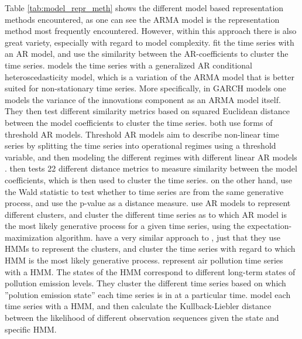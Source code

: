 Table \ref{tab:model_repr_meth} shows the different model based representation methods encountered, 
as one can see the ARMA model is the representation method most frequently encountered. 
However, within this approach there is also great variety, especially with regard to model complexity.
\textcite{shape_feat_mod_tsc_rfa, struct_damage_ar_fuzzy_c_means, ar_metric_trimmed_fuzzy_tsc_pm10, tsc_ar_metric_air_pollution} fit the time series with an AR model, and use the similarity between the AR-coefficients to cluster the time series. 
\textcite{garch_robust_tsc} models the time series with a generalized AR conditional heteroscedasticity model, which is a variation of the ARMA model that is better suited for non-stationary time series. 
More specifically, in GARCH models one models the variance of the innovations component as an ARMA model itself. 
They then test different similarity metrics based on squared Euclidean distance between the model coefficients to cluster the time series. 
\textcite{temporal_tsc_threshold_ar_models, fstar_hac_tsc} both use forms of threshold AR models. 
Threshold AR models aim to describe non-linear time series by splitting the time series into operational regimes using a threshold variable, and then modeling the different regimes with different linear AR models \cite{temporal_tsc_threshold_ar_models}. \textcite{temporal_tsc_threshold_ar_models} then tests 22 different distance metrics to measure similarity between the model coefficients, which is then used to cluster the time series. \textcite{fstar_hac_tsc} on the other hand, use the Wald statistic to test whether to time series are from the same generative process, and use the p-value as a distance measure.
\textcite{moar_mpl_tsc} use AR models to represent different clusters, and cluster the different time series as to which AR model is the most likely generative process for a given time series, using the expectation-maximization algorithm.
\textcite{mixture_gaussian_hmm} have a very similar approach to \textcite{moar_mpl_tsc}, just that they use HMMs to represent the clusters, and cluster the time series with regard to which HMM is the most likely generative process. 
\textcite{hmm_pm10_quantifying_impacts} represent air pollution time series with a HMM. 
The states of the HMM correspond to different long-term states of pollution emission levels.
They cluster the different time series based on which ''polution emission state'' each time series is in at a particular time. 
\textcite{multivariate_tsc_hmm} model each time series with a HMM, and then calculate the Kullback-Liebler distance between the likelihood of different observation sequences given the state and specific HMM. 
